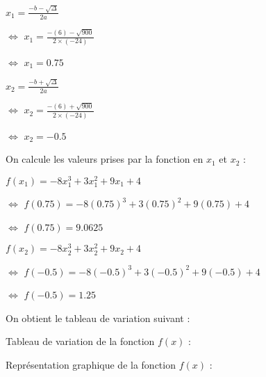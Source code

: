 \documentclass[
  12pt,
]{article}
\begin{document}
\phantom{$\Rightarrow$} \(x_1=\frac{-b-\sqrt{\Delta}}{2a}\)

\(\Leftrightarrow\) \(x_1=\frac{-(6)-\sqrt{900}}{2\times(-24)}\)

\(\Leftrightarrow\) \(x_1=0.75\)

\medskip

\phantom{$\Rightarrow$} \(x_2=\frac{-b+\sqrt{\Delta}}{2a}\)

\(\Leftrightarrow\) \(x_2=\frac{-(6)+\sqrt{900}}{2\times(-24)}\)

\(\Leftrightarrow\) \(x_2=-0.5\)

\normalsize

\bigskip

On calcule les valeurs prises par la fonction en \(x_1\) et \(x_2\) :

\large

\phantom{$\Leftrightarrow$} \(f(x_1)=-8x_1^3+3x_1^2+9x_1+4\)

\(\Leftrightarrow\) \(f(0.75)=-8(0.75)^3+3(0.75)^2+9(0.75)+4\)

\(\Leftrightarrow\) \(f(0.75)=9.0625\)

\medskip

\phantom{$\Leftrightarrow$} \(f(x_2)=-8x_2^3+3x_2^2+9x_2+4\)

\(\Leftrightarrow\) \(f(-0.5)=-8(-0.5)^3+3(-0.5)^2+9(-0.5)+4\)

\(\Leftrightarrow\) \(f(-0.5)=1.25\)

\normalsize

\vspace{1.2cm}

On obtient le tableau de variation suivant :

\medskip

\large

\begin{center}


\medskip
\normalsize
Tableau de variation de la fonction $f(x)$ :

\end{center}

\vspace{1.5cm}

\newpage

\begin{center}
\medskip
\normalsize
Représentation graphique de la fonction $f(x)$ :

\end{center}
\end{document}
